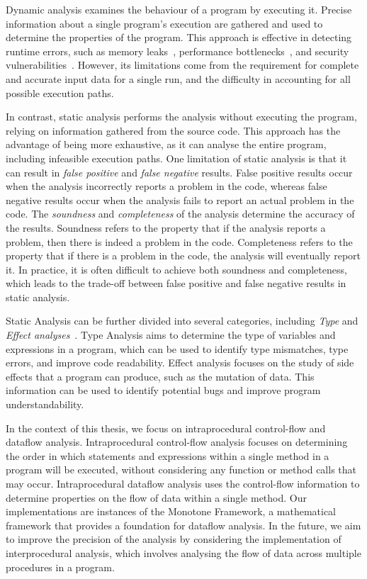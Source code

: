 Dynamic analysis examines the behaviour of a program by executing it.
Precise information about a single program's execution are gathered
and used to determine the properties of the program.
This approach is effective in detecting runtime errors, such as memory leaks~\cite{Valgrind},
performance bottlenecks~\cite{VTune}, and security vulnerabilities~\cite{li2018fuzzing}.
However, its limitations come from the requirement for complete and
accurate input data for a single run, and the difficulty in accounting for
all possible execution paths.

In contrast, static analysis performs the analysis without executing the program,
relying on information gathered from the source code. This approach has
the advantage of being more exhaustive, as it can analyse the entire program,
including infeasible execution paths.
One limitation of static analysis is that it can result in \emph{false positive}
and \emph{false negative} results. False positive results occur when the analysis
incorrectly reports a problem in the code, whereas false negative results occur
when the analysis fails to report an actual problem in the code. The \emph{soundness} and
\emph{completeness} of the analysis determine the accuracy of the results. Soundness refers
to the property that if the analysis reports a problem, then there is indeed a
problem in the code.
Completeness refers to the property that if there is a problem
in the code, the analysis will eventually report it. In practice, it is often
difficult to achieve both soundness and completeness, which leads to the trade-off
between false positive and false negative results in static analysis.

Static Analysis can be further divided into several categories, including \emph{Type}
and \emph{Effect analyses}~\cite{nielson1999type}. 
Type Analysis aims to determine the type of variables and expressions
in a program, which can be used to identify type mismatches, type errors, and improve
code readability. Effect analysis focuses on the study of side effects that a program can
produce, such as the mutation of data. This information can be used to identify
potential bugs and improve program understandability.

In the context of this thesis, we focus on intraprocedural control-flow and dataflow analysis.
Intraprocedural control-flow analysis focuses on determining the order in which
statements and expressions within a single method in a program will be executed,
without considering any function or method calls that may occur.
Intraprocedural dataflow analysis uses the control-flow information to
determine properties on the flow of data within a single method.
Our implementations are instances of the Monotone Framework, a mathematical framework that provides a
foundation for dataflow analysis. In the future, we aim to improve the precision of the analysis
by considering the implementation of interprocedural analysis, which involves
analysing the flow of data across multiple procedures in a program.

